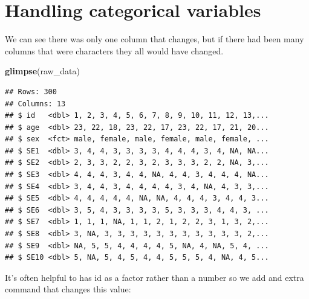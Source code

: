 \documentclass[
]{krantz}
\makeatletter
\newenvironment{Shaded}{\begin{snugshade}}{\end{snugshade}}
\newcommand{\CommentTok}[1]{\textcolor[rgb]{0.37,0.37,0.37}{\textit{#1}}}
\newcommand{\DataTypeTok}[1]{\textcolor[rgb]{0.27,0.27,0.27}{#1}}
\newcommand{\KeywordTok}[1]{\textcolor[rgb]{0.27,0.27,0.27}{\textbf{#1}}}
\newcommand{\NormalTok}[1]{#1}
\newcommand{\OperatorTok}[1]{\textcolor[rgb]{0.43,0.43,0.43}{\textbf{#1}}}
\newcommand{\StringTok}[1]{\textcolor[rgb]{0.5,0.5,0.5}{#1}}
\newenvironment{kframe}{%
\medskip{}
\setlength{\fboxsep}{.8em}
 \def\at@end@of@kframe{}%
 \ifinner\ifhmode%
  \def\at@end@of@kframe{\end{minipage}}%
  \begin{minipage}{\columnwidth}%
 \fi\fi%
 \def\FrameCommand##1{\hskip\@totalleftmargin \hskip-\fboxsep
 \colorbox{shadecolor}{##1}\hskip-\fboxsep
     \hskip-\linewidth \hskip-\@totalleftmargin \hskip\columnwidth}%
 \MakeFramed {\advance\hsize-\width
   \@totalleftmargin\z@ \linewidth\hsize
   \@setminipage}}%
 {\par\unskip\endMakeFramed%
 \at@end@of@kframe}
\renewenvironment{Shaded}{\begin{kframe}}{\end{kframe}}
\makeatother
\begin{document}
\hypertarget{handling-categorical-variables}{%
\section{Handling categorical variables}\label{handling-categorical-variables}}

\begin{Shaded}
\end{Shaded}

We can see there was only one column that changes, but if there had been many columns that were characters they all would have changed.

\begin{Shaded}
\begin{Highlighting}[]
\KeywordTok{glimpse}\NormalTok{(raw_data)}
\end{Highlighting}
\end{Shaded}

\begin{verbatim}
## Rows: 300
## Columns: 13
## $ id   <dbl> 1, 2, 3, 4, 5, 6, 7, 8, 9, 10, 11, 12, 13,...
## $ age  <dbl> 23, 22, 18, 23, 22, 17, 23, 22, 17, 21, 20...
## $ sex  <fct> male, female, male, female, male, female, ...
## $ SE1  <dbl> 3, 4, 4, 3, 3, 3, 3, 4, 4, 4, 3, 4, NA, NA...
## $ SE2  <dbl> 2, 3, 3, 2, 2, 3, 2, 3, 3, 3, 2, 2, NA, 3,...
## $ SE3  <dbl> 4, 4, 4, 3, 4, 4, NA, 4, 4, 3, 4, 4, 4, NA...
## $ SE4  <dbl> 3, 4, 4, 3, 4, 4, 4, 4, 3, 4, NA, 4, 3, 3,...
## $ SE5  <dbl> 4, 4, 4, 4, 4, NA, NA, 4, 4, 4, 3, 4, 4, 3...
## $ SE6  <dbl> 3, 5, 4, 3, 3, 3, 3, 5, 3, 3, 3, 4, 4, 3, ...
## $ SE7  <dbl> 1, 1, 1, NA, 1, 1, 2, 1, 2, 2, 3, 1, 3, 2,...
## $ SE8  <dbl> 3, NA, 3, 3, 3, 3, 3, 3, 3, 3, 3, 3, 3, 2,...
## $ SE9  <dbl> NA, 5, 5, 4, 4, 4, 4, 5, NA, 4, NA, 5, 4, ...
## $ SE10 <dbl> 5, NA, 5, 4, 5, 4, 4, 5, 5, 5, 4, NA, 4, 5...
\end{verbatim}

It's often helpful to has id as a factor rather than a number so we add and extra command that changes this value:

\begin{Shaded}
\end{Shaded}
\end{document}
